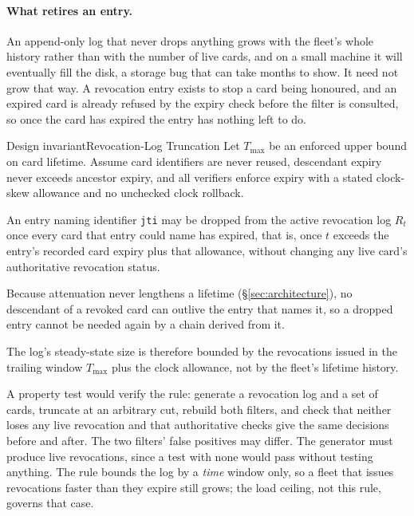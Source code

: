 \documentclass[11pt,a4paper]{article}
\theoremstyle{definition}
\begin{document}


\paragraph{What retires an entry.} %
An append-only log that never drops anything grows with the fleet's whole
history rather than with the number of live cards, and on a small machine it
will eventually fill the disk, a storage bug that can take months to show.
It need not grow that way. A revocation entry
exists to stop a card being honoured, and an expired card is already refused
by the expiry check before the filter is consulted, so once the card has
expired the entry has nothing left to do.

\begin{pdclaim}{Design invariant}{Revocation-Log Truncation}\label{def:revocation-truncation}
\setlength{\parskip}{4pt plus 1pt}
Let $T_{\max}$ be an enforced upper bound on card lifetime. Assume card identifiers
are never reused, descendant expiry never exceeds ancestor expiry, and all
verifiers enforce expiry with a stated clock-skew allowance and no unchecked
clock rollback.

An entry naming identifier \texttt{jti} may be dropped from the active
revocation log
$R_t$ once every card that entry could name has expired, that is, once
$t$ exceeds the entry's recorded card expiry plus that allowance, without
changing any live card's authoritative revocation status.

Because attenuation
never lengthens a lifetime (\S\ref{sec:architecture}), no descendant of a
revoked card can outlive the entry that names it, so a dropped entry cannot be
needed again by a chain derived from it.

The log's steady-state size is therefore
bounded by the revocations issued in the trailing window $T_{\max}$ plus the
clock allowance, not by the
fleet's lifetime history.
\end{pdclaim}

A property test would verify the rule: generate a revocation log and a set of
cards, truncate at an arbitrary cut, rebuild both filters, and check that
neither loses any live revocation and that authoritative checks give the same
decisions before and after. The two filters' false positives may differ. The
generator must produce live revocations, since a test with none would pass
without testing anything. The rule bounds the log by a \emph{time} window only,
so a fleet that issues revocations faster than they expire still grows; the
load ceiling, not this rule, governs that case.
\end{document}
